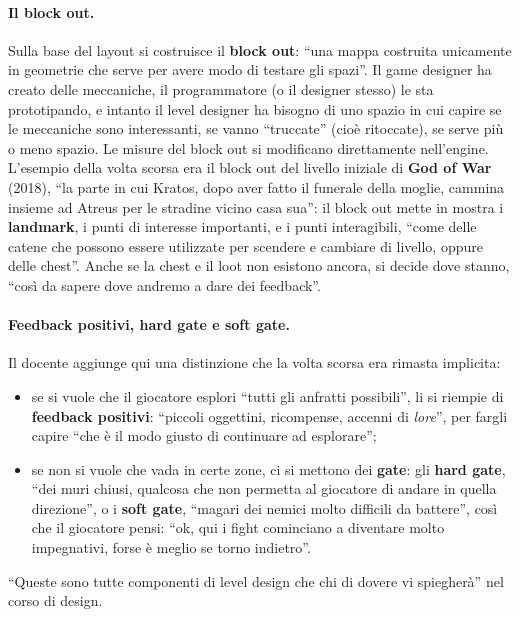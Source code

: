 \paragraph{Il block out.} Sulla base del layout si costruisce il \textbf{block out}: ``una
mappa costruita unicamente in geometrie che serve per avere modo di testare gli spazi''. Il
game designer ha creato delle meccaniche, il programmatore (o il designer stesso) le sta
prototipando, e intanto il level designer ha bisogno di uno spazio in cui capire se le
meccaniche sono interessanti, se vanno ``truccate'' (cioè ritoccate), se serve più o meno
spazio. Le misure del block out si modificano direttamente nell'engine. L'esempio della
volta scorsa era il block out del livello iniziale di \textbf{God of War} (2018), ``la parte
in cui Kratos, dopo aver fatto il funerale della moglie, cammina insieme ad Atreus per le
stradine vicino casa sua'': il block out mette in mostra i \textbf{landmark}, i punti di
interesse importanti, e i punti interagibili, ``come delle catene che possono essere
utilizzate per scendere e cambiare di livello, oppure delle chest''. Anche se la chest e il
loot non esistono ancora, si decide dove stanno, ``così da sapere dove andremo a dare dei
feedback''.

\paragraph{Feedback positivi, hard gate e soft gate.} Il docente aggiunge qui una
distinzione che la volta scorsa era rimasta implicita:
\begin{itemize}
  \item se si vuole che il giocatore esplori ``tutti gli anfratti possibili'', li si riempie
        di \textbf{feedback positivi}: ``piccoli oggettini, ricompense, accenni di
        \emph{lore}'', per fargli capire ``che è il modo giusto di continuare ad esplorare'';
  \item se non si vuole che vada in certe zone, ci si mettono dei \textbf{gate}: gli
        \textbf{hard gate}, ``dei muri chiusi, qualcosa che non permetta al giocatore di
        andare in quella direzione'', o i \textbf{soft gate}, ``magari dei nemici molto
        difficili da battere'', così che il giocatore pensi: ``ok, qui i fight cominciano a
        diventare molto impegnativi, forse è meglio se torno indietro''.
\end{itemize}
``Queste sono tutte componenti di level design che chi di dovere vi spiegherà'' nel corso
di design.

